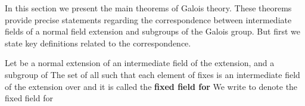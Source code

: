 \documentclass[11pt,oneside]{article}
\begin{document}
\fi
\renewcommand{\BookFooter}{Section 46 Galois Theory}
\ifdefined\BookMaster\else\setcounter{page}{364}\fi
\BookNarrativetrue

\begin{BookBody}



\noindent In this section we present the main theorems of Galois theory. These theorems provide precise statements regarding the correspondence between intermediate fields of a normal field extension and subgroups of the Galois group. But first we state key definitions related to the correspondence.

 Let  be a normal extension of  an intermediate field of the extension, and  a subgroup of  The set of all  such that each element of  fixes \BookInline{\alpha } is an 
intermediate field of the extension  over  and it is called the\textbf{ fixed field for}  We write  to denote the fixed field for 

\end{BookBody}

\BookNarrativetrue
\end{document}
